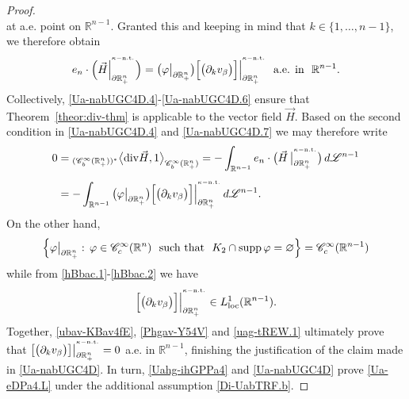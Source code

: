 \documentclass[11pt,reqno]{amsart}
\numberwithin{equation}{section}
\theoremstyle{remark}
\begin{document}
\begin{proof}
\begin{equation}
\end{equation}
%
at a.e. point on ${\mathbb{R}}^{n-1}$.
Granted this and keeping in mind that $k\in\{1,\dots,n-1\}$, 
we therefore obtain 
%
\begin{equation}\label{Ua-nabUGC4D.7}
e_n\cdot\Big(\vec{H}\Big|_{\partial\mathbb{R}^{n}_{+}}^{{}^{\kappa-{\rm n.t.}}}\Big)
=\big(\varphi\big|_{\partial\mathbb{R}^{n}_{+}}\big)
\Big[\big(\partial_k v_{\beta}\big)\Big]
\Big|_{\partial\mathbb{R}^{n}_{+}}^{{}^{\kappa-{\rm n.t.}}}
\,\,\text{ a.e. in }\,\,{\mathbb{R}}^{n-1}.
\end{equation}
%
Collectively, \eqref{Ua-nabUGC4D.4}-\eqref{Ua-nabUGC4D.6} ensure that 
Theorem~\ref{theor:div-thm} is applicable to the vector field $\vec{H}$. 
Based on the second condition in \eqref{Ua-nabUGC4D.4} and \eqref{Ua-nabUGC4D.7} 
we may therefore write 
%
\begin{align}\label{Phgav-Y54V}
0 & ={}_{(\mathscr{C}_b^\infty(\mathbb{R}^n_+))^*}\big\langle{\rm div}\vec{H},1
\big\rangle_{\mathscr{C}_b^\infty(\mathbb{R}^n_+)} 
=-\int_{\mathbb{R}^{n-1}}e_n\cdot
\big(\vec{H}\,\big|^{{}^{\kappa-{\rm n.t.}}}_{\partial\mathbb{R}^n_+}\big)\,d{\mathscr{L}}^{n-1}
\nonumber\\[4pt]
&=-\int_{\mathbb{R}^{n-1}}\big(\varphi\big|_{\partial\mathbb{R}^{n}_{+}}\big)
\Big[\big(\partial_k v_{\beta}\big)
\Big]\Big|_{\partial\mathbb{R}^{n}_{+}}^{{}^{\kappa-{\rm n.t.}}}\,d{\mathscr{L}}^{n-1}.
\end{align}
%
On the other hand, 
%
\begin{equation}\label{uag-tREW.1}
\Big\{\varphi\big|_{\partial\mathbb{R}^{n}_{+}}:\,
\varphi\in{\mathscr{C}}^\infty_c({\mathbb{R}}^n)\,\,
\text{ such that }\,\,K_2\cap{\rm supp}\,\varphi=\varnothing\Big\}
={\mathscr{C}}^\infty_c({\mathbb{R}}^{n-1})
\end{equation}
%
while from \eqref{hBbac.1}-\eqref{hBbac.2} we have 
%
\begin{equation}\label{ubav-KBav4fE}
\Big[\big(\partial_k v_{\beta}\big)
\Big]\Big|_{\partial\mathbb{R}^{n}_{+}}^{{}^{\kappa-{\rm n.t.}}}\in L^1_{\rm loc}({\mathbb{R}}^{n-1}).
\end{equation}
%
Together, \eqref{ubav-KBav4fE}, \eqref{Phgav-Y54V} and \eqref{uag-tREW.1} 
ultimately prove that $\big[\big(\partial_k v_{\beta}\big)\big]
\big|_{\partial\mathbb{R}^{n}_{+}}^{{}^{\kappa-{\rm n.t.}}}=0$ a.e. in ${\mathbb{R}}^{n-1}$, 
finishing the justification of the claim made in \eqref{Ua-nabUGC4D}. 
In turn, \eqref{Uahg-ihGPPa4} and \eqref{Ua-nabUGC4D} prove \eqref{Ua-eDPa4.L} 
under the additional assumption \eqref{Di-UabTRF.b}. 


\end{proof}
\end{document}

